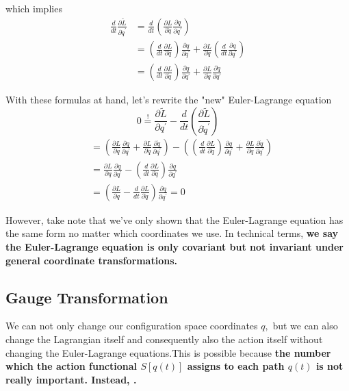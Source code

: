\begin{mybox2}
$$$$
which implies
$$
\begin{aligned}
\frac{d}{d t} \frac{\partial \tilde{L}}{\partial \dot{q}^{\prime}} &= \frac{d}{d t}\left(\frac{\partial L}{\partial \dot{q}} \frac{\partial q}{\partial q^{\prime}}\right) \\
&=\left(\frac{d}{d t} \frac{\partial L}{\partial \dot{q}}\right) \frac{\partial q}{\partial q^{\prime}}+\frac{\partial L}{\partial \dot{q}}\left(\frac{d}{d t} \frac{\partial q}{\partial q^{\prime}}\right) \\
&=\left(\frac{d}{d t} \frac{\partial L}{\partial \dot{q}}\right) \frac{\partial q}{\partial q^{\prime}}+\frac{\partial L}{\partial \dot{q}} \frac{\partial \dot{q}}{\partial q^{\prime}}
\end{aligned}
$$
\end{mybox2}
\begin{mybox2}
With these formulas at hand, let’s rewrite the "new" Euler-Lagrange equation
$$
0 \stackrel{!}{=} \frac{\partial \tilde{L}}{\partial q^{\prime}}-\frac{d}{d t}\left(\frac{\partial \tilde{L}}{\partial \dot{q}^{\prime}}\right)
$$
$$
\begin{aligned}
&=\left(\frac{\partial L}{\partial q} \frac{\partial q}{\partial q^{\prime}}+\frac{\partial L}{\partial \dot{q}} \frac{\partial \dot{q}}{\partial q^{\prime}}\right)-\left(\left(\frac{d}{d t} \frac{\partial L}{\partial \dot{q}}\right) \frac{\partial q}{\partial q^{\prime}}+\frac{\partial L}{\partial \dot{q}} \frac{\partial \dot{q}}{\partial q^{\prime}}\right)\\
&=\frac{\partial L}{\partial q} \frac{\partial q}{\partial q^{\prime}}-\left(\frac{d}{d t} \frac{\partial L}{\partial \dot{q}}\right) \frac{\partial q}{\partial q^{\prime}}\\
&=\left(\frac{\partial L}{\partial q}-\frac{d}{d t} \frac{\partial L}{\partial \dot{q}}\right) \frac{\partial q}{\partial q^{\prime}}=0
\end{aligned}
$$
\end{mybox2}

However, take note that we’ve only shown that the Euler-Lagrange equation has the same form no matter which coordinates we use. In technical terms,\textbf{ we say the Euler-Lagrange equation is only covariant but not invariant under general coordinate transformations.}


\subsection{Gauge Transformation}
We can not only change our configuration space coordinates $q,$ but we can also change the Lagrangian itself and consequently also the action itself without changing the Euler-Lagrange equations.This is possible because \textbf{the number which the action functional $S[q(t)]$ assigns to each path $q(t)$ is not really important. Instead, .}

